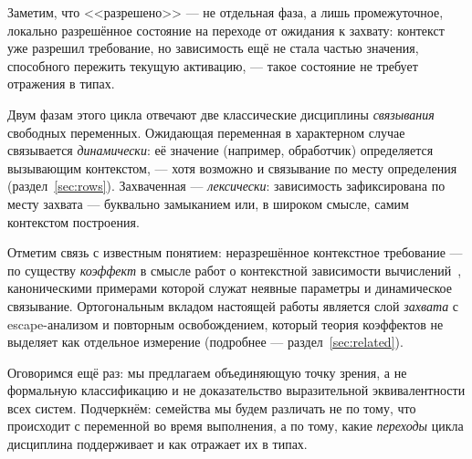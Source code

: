 \documentclass{ProcISPRAS}
\begin{document}
Заметим, что <<разрешено>> --- не отдельная фаза, а лишь промежуточное, локально
разрешённое состояние на переходе от ожидания к захвату: контекст уже разрешил требование, но зависимость ещё не
стала частью значения, способного пережить текущую активацию, --- такое состояние не
требует отражения в типах.

Двум фазам этого цикла отвечают две классические дисциплины \emph{связывания} свободных
переменных. Ожидающая переменная в характерном случае связывается \emph{динамически}:
её значение (например, обработчик) определяется вызывающим контекстом, --- хотя
возможно и связывание по месту определения (раздел~\ref{sec:rows}). Захваченная ---
\emph{лексически}: зависимость зафиксирована по месту захвата --- буквально замыканием
или, в широком смысле, самим контекстом построения.

Отметим связь с известным понятием: неразрешённое контекстное требование --- по существу
\emph{коэффект} в смысле работ о контекстной зависимости вычислений~\cite{petricek2014coeffects},
каноническими примерами которой служат неявные параметры и динамическое связывание.
Ортогональным вкладом настоящей работы является слой \emph{захвата} с escape-анализом и
повторным освобождением, который теория коэффектов не выделяет как отдельное измерение
(подробнее --- раздел~\ref{sec:related}).

\begin{figure}[t]
\centering
{}
\label{fig:lifecycle}
\end{figure}

Оговоримся ещё раз: мы предлагаем объединяющую точку зрения, а не формальную
классификацию и не доказательство выразительной эквивалентности всех систем.
Подчеркнём: семейства мы будем различать не по тому, что происходит с переменной во
время выполнения, а по тому, какие \emph{переходы} цикла дисциплина поддерживает и как
отражает их в типах.
\end{document}
